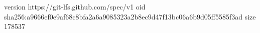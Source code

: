 version https://git-lfs.github.com/spec/v1
oid sha256:a9666ef0e9af68c8bfa2a6a9085323a2b8ec9d47f13bc06a6b9d05ff5585f3ad
size 178537

